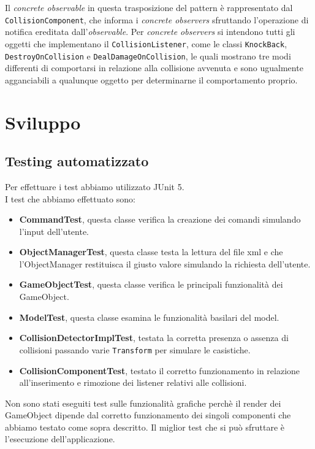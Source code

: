 \documentclass[a4paper,12pt]{report}
\begin{document}
%
Il \textit{concrete observable} in questa trasposizione del pattern è rappresentato dal \texttt{CollisionComponent}, che informa i \textit{concrete observers} sfruttando l'operazione di notifica ereditata dall'\textit{observable}.
Per \textit{concrete observers} si intendono tutti gli oggetti che implementano il \texttt{CollisionListener}, come le classi \texttt{KnockBack}, \texttt{DestroyOnCollision} e \texttt{DealDamageOnCollision}, le quali mostrano tre modi differenti di comportarsi in relazione alla collisione avvenuta e sono ugualmente agganciabili a qualunque oggetto per determinarne il comportamento proprio.
%
\chapter{Sviluppo}
\section{Testing automatizzato}

Per effettuare i test abbiamo utilizzato JUnit 5.
\\I test che abbiamo effettuato sono:
\begin{itemize}
	\item \textbf{CommandTest}, questa classe verifica la creazione dei comandi simulando l'input dell'utente.
	\item \textbf{ObjectManagerTest}, questa classe testa la lettura del file xml e che l'ObjectManager restituisca il giusto valore simulando la richiesta dell'utente.
	\item \textbf{GameObjectTest}, questa classe verifica le principali funzionalità dei GameObject.
    \item \textbf{ModelTest}, questa classe esamina le funzionalità basilari del model.
    \item \textbf{CollisionDetectorImplTest}, testata la corretta presenza o assenza di collisioni passando varie \texttt{Transform} per simulare le casistiche.
    \item \textbf{CollisionComponentTest}, testato il corretto funzionamento in relazione all'inserimento e rimozione dei listener relativi alle collisioni.
\end{itemize}
Non sono stati eseguiti test sulle funzionalità grafiche perchè il render dei GameObject dipende dal corretto funzionamento dei singoli componenti che abbiamo testato come sopra descritto. Il miglior test che si può sfruttare è l'esecuzione dell'applicazione.
\newpage
\end{document}
